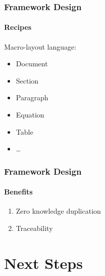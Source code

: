 \documentclass{beamer}
\begin{document}

\begin{frame}

\frametitle{Framework Design}

\framesubtitle{Recipes}


Macro-layout language:
\begin{itemize}
	\item Document
	\item Section
	\item Paragraph
	\item Equation
	\item Table
	\item \ldots
\end{itemize}



\end{frame}


\begin{frame}

\frametitle{Framework Design}

\framesubtitle{Benefits}


\begin{enumerate}
	\item Zero knowledge duplication
	\item Traceability
\end{enumerate}


\end{frame}


\section[Next Steps]{Next Steps}

\end{document}
